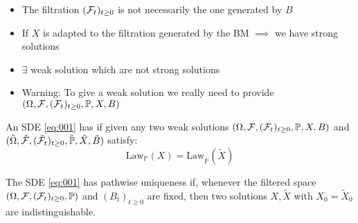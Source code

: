 \begin{remark}
    \begin{itemize}
        \item The filtration $(\mathcal{F}_t)_{t\geq 0}$ is not necessarily the one generated by $B$
        \item If $X$ is adapted to the filtration generated by the BM $\implies$ we have strong solutions
        \item $\exists$ weak solution which are not strong solutions
        \item Warning: To give a weak solution we really need to provide  $(\Omega,\mathcal{F},(\mathcal{F}_t)_{t\geq 0},\mathbb{P},X,B)$ 
    \end{itemize}
\end{remark}

\begin{definition}\label{def:uniqueness_in_law}
    An SDE \ref{eq:001} has  if given any two weak solutions $(\Omega,\mathcal{F},(\mathcal{F}_t)_{t\geq 0},\mathbb{P},X,B)$
    and $(\tilde{\Omega},\tilde{\mathcal{F}},(\tilde{\mathcal{F}}_t)_{t\geq 0},\tilde{\mathbb{P}},\tilde{X},\tilde{B})$ satisfy:
    \[\text{Law}_{\mathbb{P}}(X)=\text{Law}_{\tilde{\mathbb{P}}}(\tilde{X})\]
\end{definition}

\begin{definition}\label{def:pathwise_uniqueness}
    The SDE \ref{eq:001} has pathwise uniqueness if, whenever
    the filtered space $(\Omega,\mathcal{F},(\mathcal{F}_t)_{t\geq 0},\mathbb{P})$
    and  $(B_t)_{t\geq 0}$ are fixed, then two solutions $X,\tilde{X}$
    with $X_0=\tilde{X}_0$ are indistinguishable.
\end{definition}

